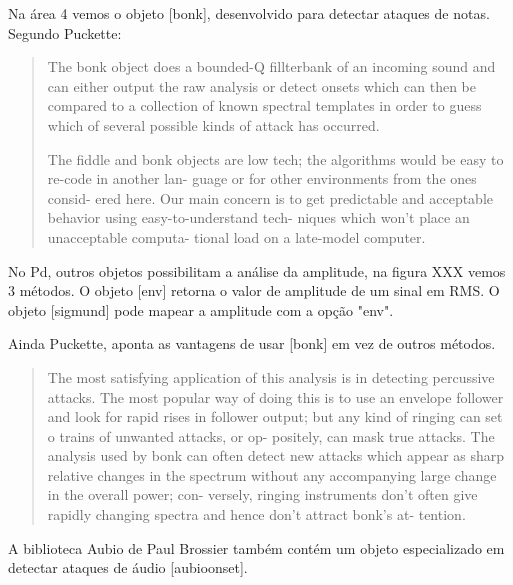 \documentclass[draft]{ppgmus}
\begin{document}


Na área 4 vemos o objeto [bonk\texttildelow], desenvolvido para
detectar ataques de notas. Segundo Puckette:


\begin{quotation}
 The bonk object does a bounded-Q fillterbank of an incoming sound and
can either output the raw analysis or detect onsets
which can then be compared to a collection of known
spectral templates in order to guess which of several
possible kinds of attack has occurred.

The fiddle and bonk objects are low tech; the
algorithms would be easy to re-code in another lan-
guage or for other environments from the ones consid-
ered here. Our main concern is to get predictable and
acceptable behavior using easy-to-understand tech-
niques which won't place an unacceptable computa-
tional load on a late-model computer.
\end{quotation}

No Pd, outros objetos possibilitam a análise da amplitude,
na figura XXX vemos 3 métodos. O objeto [env\texttildelow]
retorna o valor de amplitude de um sinal em RMS. O objeto
[sigmund\texttildelow] pode mapear a amplitude com a opção
"env".


Ainda Puckette, aponta as vantagens de usar [bonk\texttildelow]
em vez de outros métodos.

\begin{quotation}
 
The most satisfying application of this analysis is in
detecting percussive attacks. The most popular way
of doing this is to use an envelope follower and look
for rapid rises in follower output; but any kind of
ringing can set o trains of unwanted attacks, or op-
positely, can mask true attacks. The analysis used by
bonk can often detect new attacks which appear as
sharp relative changes in the spectrum without any
accompanying large change in the overall power; con-
versely, ringing instruments don't often give rapidly
changing spectra and hence don't attract bonk's at-
tention.
\end{quotation}

A biblioteca Aubio de Paul Brossier também contém um objeto
especializado em detectar ataques de áudio [aubioonset\texttildelow].


\end{document}
